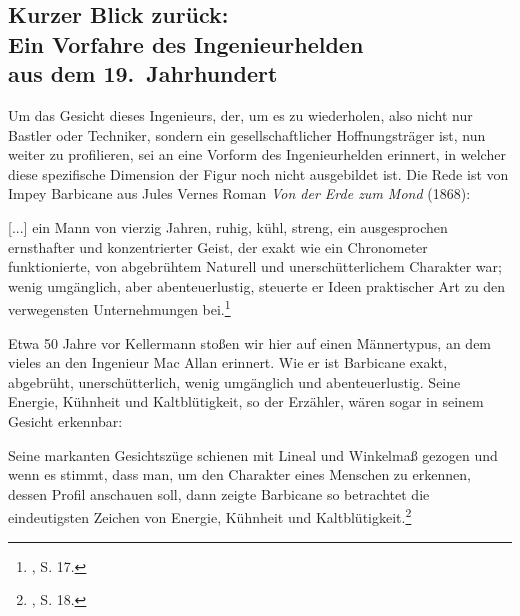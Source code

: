 \documentclass[%
	fontsize=10pt,%
	twoside,%
	headings=optiontoheadandtoc,%
	showtrims]{scrbook}
\makeatletter
\renewcommand{\hrulefill}{\newpage\par\@afterindentfalse\@afterheading}
\renewenvironment{quote}{%
  \addmargin[\genericindent]{0pt}%
  \KOMAoptions{parskip=true}%
  \ifdim\parskip>0pt\else\addvspace{\intextsep}\fi
}{%
  \par
  \endaddmargin\vspace{\intextsep}
}
\makeatother
\begin{document}
\subsection[Kurzer Blick zurück:    Ein Vorfahre des Ingenieurhelden    aus dem 19.~Jahrhundert]{Kurzer Blick zurück: \- \protect\\ Ein Vorfahre des Ingenieurhelden \- \protect\\ aus dem 19.~Jahrhundert}
\par Um das Gesicht dieses Ingenieurs, der, um es zu wiederholen, also nicht nur Bastler oder Techniker, sondern ein gesellschaftlicher Hoffnungsträger ist, nun weiter zu profilieren, sei an eine Vorform des Ingenieurhelden erinnert, in welcher diese spezifische Dimension der Figur noch nicht ausgebildet ist. Die Rede ist von Impey Barbicane aus Jules Vernes Roman \emph{Von der Erde zum Mond} (1868):\begin{quote}
\par {[}...{]} ein Mann von vierzig Jahren, ruhig, kühl, streng, ein ausgesprochen ernsthafter und konzentrierter Geist, der exakt wie ein Chronometer funktionierte, von abgebrühtem Naturell und unerschütterlichem Charakter war; wenig umgänglich, aber abenteuerlustig, steuerte er Ideen praktischer Art zu den verwegensten Unternehmungen bei.\footnote{\cite[][]{verne2013a}, S. 17.} 
\end{quote}
\hrulefill
\par Etwa 50 Jahre vor Kellermann stoßen wir hier auf einen Männertypus, an dem vieles an den Ingenieur Mac Allan erinnert. Wie er ist Barbicane exakt, abgebrüht, unerschütterlich, wenig umgänglich und abenteuerlustig. Seine Energie, Kühnheit und Kaltblütigkeit, so der Erzähler, wären sogar in seinem Gesicht erkennbar:\begin{quote}
\par Seine markanten Gesichtszüge schienen mit Lineal und Winkelmaß gezogen und wenn es stimmt, dass man, um den Charakter eines Menschen zu erkennen, dessen Profil anschauen soll, dann zeigte Barbicane so betrachtet die eindeutigsten Zeichen von Energie, Kühnheit und Kaltblütigkeit.\footnote{\cite[][]{verne2013a}, S. 18.} 
\end{quote}
\end{document}
